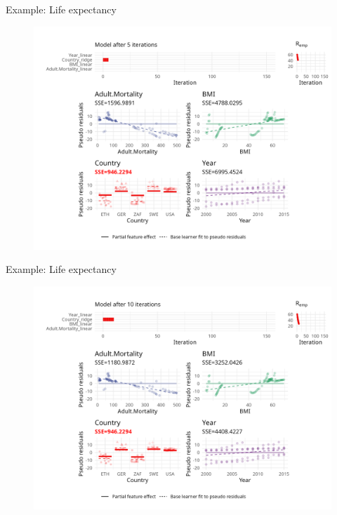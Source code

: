 \begin{frame}{Example: Life expectancy}
	\begin{figure}
		\centering
		\includegraphics[width=\textwidth]{figure/cwb-anim/fig-iter-0005.png}
	\end{figure}
	\addtocounter{framenumber}{-1}
\end{frame}


\begin{frame}{Example: Life expectancy}
	\begin{figure}
		\centering
		\includegraphics[width=\textwidth]{figure/cwb-anim/fig-iter-0010.png}
	\end{figure}
	\addtocounter{framenumber}{-1}
\end{frame}


